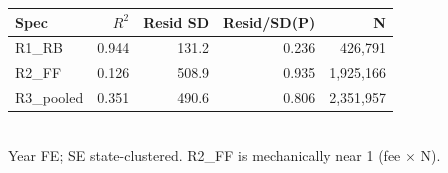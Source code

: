 \begin{table}[ht]
\centering
\small
\renewcommand{\arraystretch}{1.15}
\begin{tabular}{lrrrr}
\hline
Spec & $R^2$ & Resid SD & Resid/SD(P) & N \\
\hline
R1\_RB & 0.944 & 131.2 & 0.236 &   426,791 \\
R2\_FF & 0.126 & 508.9 & 0.935 & 1,925,166 \\
R3\_pooled & 0.351 & 490.6 & 0.806 & 2,351,957 \\
\hline
\end{tabular}
\\[2pt]{\footnotesize Year FE; SE state-clustered. R2\_FF is mechanically near 1 (fee $\times$ N).}
\end{table}
